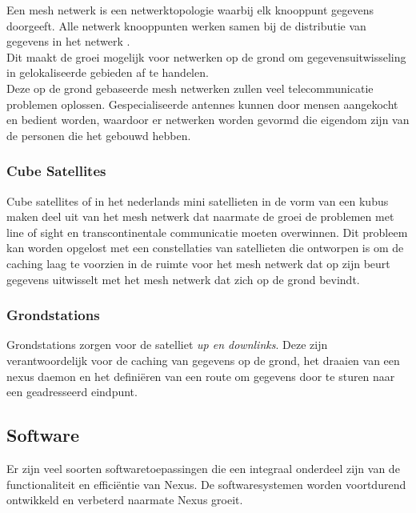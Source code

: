 \documentclass[11pt]{article}
\begin{document}
Een mesh netwerk is een netwerktopologie waarbij elk knooppunt gegevens doorgeeft. Alle netwerk knooppunten werken samen bij de distributie van gegevens in het netwerk \cite{meshnetworks}.\\ 

\noindent 
Dit maakt de groei mogelijk voor netwerken op de grond om gegevensuitwisseling in gelokaliseerde gebieden af ​​te handelen.\\

\noindent Deze op de grond gebaseerde mesh netwerken zullen veel telecommunicatie problemen oplossen. Gespecialiseerde antennes kunnen door mensen aangekocht en bedient worden, waardoor er netwerken worden gevormd die eigendom zijn van de personen die het  gebouwd hebben.

\subsubsection{Cube Satellites}

Cube satellites of in het nederlands mini satellieten in de vorm van een kubus maken deel uit van het mesh netwerk dat naarmate de groei de problemen met line of sight en transcontinentale communicatie moeten overwinnen. Dit probleem kan worden opgelost met een constellaties van satellieten die ontworpen is om de caching laag te voorzien in de ruimte voor het mesh netwerk dat op zijn beurt gegevens uitwisselt met het mesh netwerk dat zich op de grond bevindt.

\subsubsection{Grondstations}

Grondstations zorgen voor de satelliet \textit{up en downlinks}. 
Deze zijn verantwoordelijk voor de  caching van gegevens op de grond, het draaien van een nexus daemon en het definiëren van een route om gegevens door te sturen naar een geadresseerd eindpunt.

\subsection{Software}

Er zijn veel soorten softwaretoepassingen die een integraal onderdeel zijn van de functionaliteit en efficiëntie van Nexus. De softwaresystemen worden voortdurend ontwikkeld en verbeterd naarmate Nexus groeit.
\end{document}
